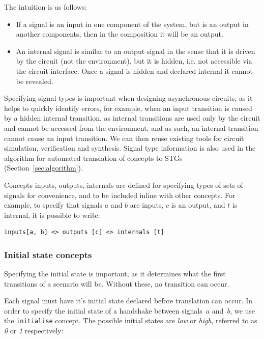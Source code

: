 \documentclass[british,conference,compsoc]{IEEEtran}
\begin{document}
The intuition is as follows:
\begin{itemize}
    \item If a signal is an input in one component of the system, but is an
    output in another components, then in the composition it will be an output.
    \item An internal signal is similar to an output signal in the sense
that it is driven by the circuit (not the environment), but it is hidden, 
i.e. not accessible via the circuit interface. Once a signal is hidden and 
declared internal it cannot be revealed.
\end{itemize}

\noindent Specifying signal types is important when designing asynchronous
circuits, as it helps to quickly identify errors, for example, when an input transition is
caused by a hidden internal transition, as internal transitions are used only by the circuit 
and cannot be accessed from the environment, and as such, an internal transition cannot
cause an input transition. We can then reuse existing tools for circuit
simulation, verification and synthesis. Signal type information is also used
in the algorithm for automated translation of concepts to
STGs (Section~\ref{sec:algorithm}).

Concepts \textsf{inputs}, \textsf{outputs}, \textsf{internals} are defined for
specifying types of sets of signals for convenience, and to be included inline 
with other concepts. For example, to specify that signals $a$ and $b$ are 
inputs, $c$ is an output, and $t$ is internal, it is possible to write:

\begin{verbatim}
inputs[a, b] <> outputs [c] <> internals [t]
\end{verbatim}

\vspace{-4mm}

\subsubsection{Initial state concepts\label{sub:initState}}

Specifying the initial state is important, as it determines what the first 
transitions of a scenario will be. Without these, no transition can occur.

Each signal must have it's initial state declared before translation can occur. 
In order to specify the initial state of a handshake between signals~$a$
and~$b$, we use the \texttt{initialise} concept.
The possible initial states are \emph{low} or \emph{high}, referred to as 
\emph{0} or \emph{1} respectively:
\end{document}
